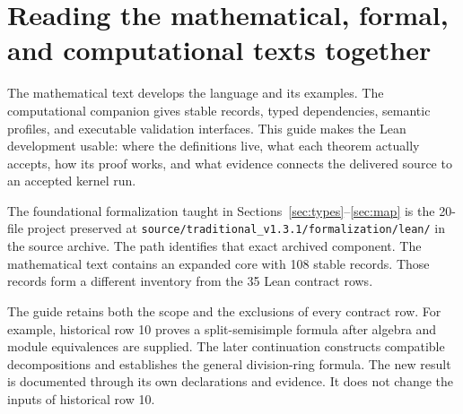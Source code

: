 \documentclass[11pt,a4paper]{article}
\newcommand{\code}[1]{\nolinkurl{#1}}
\begin{document}
\KomorebiCover
{}

\tableofcontents
\clearpage

\section{Reading the mathematical, formal, and computational texts together}

The mathematical text develops the language and its examples. The computational companion gives stable records, typed dependencies, semantic profiles, and executable validation interfaces. This guide makes the Lean development usable: where the definitions live, what each theorem actually accepts, how its proof works, and what evidence connects the delivered source to an accepted kernel run.

The foundational formalization taught in Sections~\ref{sec:types}--\ref{sec:map} is the 20-file project preserved at \code{source/traditional_v1.3.1/formalization/lean/} in the source archive. The path identifies that exact archived component. The mathematical text contains an expanded core with 108 stable records. Those records form a different inventory from the 35 Lean contract rows.

The guide retains both the scope and the exclusions of every contract row. For example, historical row 10 proves a split-semisimple formula after algebra and module equivalences are supplied. The later continuation constructs compatible decompositions and establishes the general division-ring formula. The new result is documented through its own declarations and evidence. It does not change the inputs of historical row 10.
\end{document}
